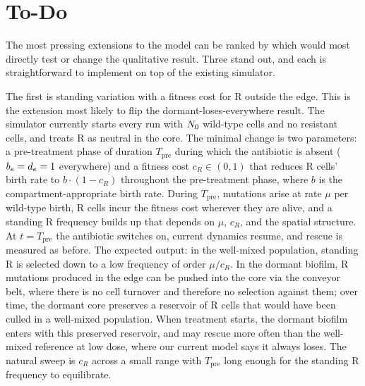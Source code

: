 \section{To-Do}
\label{sec:todo}

The most pressing extensions to the model can be ranked by which would most directly test or change the qualitative result. Three stand out, and each is straightforward to implement on top of the existing simulator.

The first is standing variation with a fitness cost for R outside the edge. This is the extension most likely to flip the dormant-loses-everywhere result. The simulator currently starts every run with $N_0$ wild-type cells and no resistant cells, and treats R as neutral in the core. The minimal change is two parameters: a pre-treatment phase of duration $T_{\mathrm{pre}}$ during which the antibiotic is absent ($b_e = d_e = 1$ everywhere) and a fitness cost $c_R \in (0, 1)$ that reduces R cells' birth rate to $b \cdot (1 - c_R)$ throughout the pre-treatment phase, where $b$ is the compartment-appropriate birth rate. During $T_{\mathrm{pre}}$, mutations arise at rate $\mu$ per wild-type birth, R cells incur the fitness cost wherever they are alive, and a standing R frequency builds up that depends on $\mu$, $c_R$, and the spatial structure. At $t = T_{\mathrm{pre}}$ the antibiotic switches on, current dynamics resume, and rescue is measured as before. The expected output: in the well-mixed population, standing R is selected down to a low frequency of order $\mu / c_R$. In the dormant biofilm, R mutations produced in the edge can be pushed into the core via the conveyor belt, where there is no cell turnover and therefore no selection against them; over time, the dormant core preserves a reservoir of R cells that would have been culled in a well-mixed population. When treatment starts, the dormant biofilm enters with this preserved reservoir, and may rescue more often than the well-mixed reference at low dose, where our current model says it always loses. The natural sweep is $c_R$ across a small range with $T_{\mathrm{pre}}$ long enough for the standing R frequency to equilibrate.


